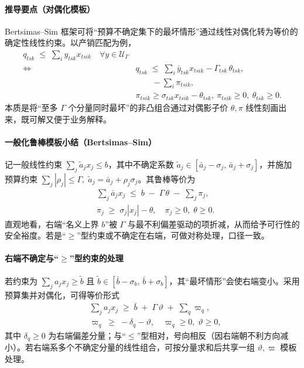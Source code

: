 \paragraph{推导要点（对偶化模板）}
Bertsimas–Sim 框架可将“预算不确定集下的最坏情形”通过线性对偶化转为等价的确定性线性约束。以产销匹配为例，
\begin{align}
  q_{tsk} \;\le\; \sum_i y_{tsk} x_{tsik} \quad \forall y\in\mathcal U_\Gamma \\
  \iff~& q_{tsk} \;\le\; \sum_i \bar y_{tsk} x_{tsik} - \Gamma_{tsk} \, \theta_{tsk} , \label{tmpl:model2-bs-1} \\
  & \qquad - \sum_i \pi_{tsik}, \nonumber \\
  & \pi_{tsik} \ge \sigma_{tsk} x_{tsik} - \theta_{tsk},~ \pi_{tsik}\ge0,~ \theta_{tsk}\ge0. \label{tmpl:model2-bs-2}
\end{align}
本质是将“至多 $\Gamma$ 个分量同时最坏”的非凸组合通过对偶影子价 $\theta,\pi$ 线性刻画出来，既可解又便于业务解释。

\paragraph{一般化鲁棒模板小结（Bertsimas–Sim）}
记一般线性约束 $\sum_j \tilde a_j x_j \le b$，其中不确定系数 $\tilde a_j\in[\bar a_j-\sigma_j,\,\bar a_j+\sigma_j]$，并施加预算约束 $\sum_j |\rho_j|\le\Gamma,\; \tilde a_j=\bar a_j+\rho_j\sigma_j$。其鲁棒等价为
\begin{align}
  & \sum_j \bar a_j x_j \;\le\; b \; - \; \Gamma\,\theta \; - \; \sum_j \pi_j, \label{tmpl:bs-generic-1} \\
  & \pi_j \;\ge\; \sigma_j |x_j| - \theta,\quad \pi_j\ge0,\;\theta\ge0. \label{tmpl:bs-generic-2}
\end{align}
直观地看，右端“名义上界 $b$”被 $\Gamma$ 与最不利偏差驱动的项折减，从而给予可行性的安全裕度。若是“$\ge$”型约束或不确定在右端，可做对称处理，口径一致。

\paragraph{右端不确定与“$\ge$”型约束的处理}
若约束为 $\sum_j a_j x_j \ge \tilde b$ 且 $\tilde b\in[\bar b-\sigma_b,\,\bar b+\sigma_b]$，其“最坏情形”会使右端变小。采用预算集并对偶化，可得等价形式
\begin{align}
  & \sum_j a_j x_j \;\ge\; \bar b \; + \; \Gamma\,\vartheta \; + \; \sum_{q} \varpi_q, \label{tmpl:bs-rhs-1} \\
  & \varpi_q \;\ge\; -\delta_q - \vartheta,\quad \varpi_q\ge0,\;\vartheta\ge0, \label{tmpl:bs-rhs-2}
\end{align}
其中 $\delta_q\ge0$ 为右端偏差分量；与“$\le$”型相对，号向相反（因右端朝不利方向减小）。若右端系多个不确定分量的线性组合，可按分量求和后共享一组 $\vartheta,\varpi$ 模板处理。

